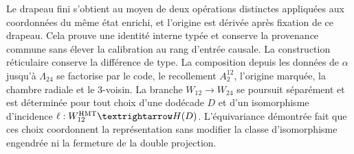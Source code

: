 Le drapeau fini s'obtient au moyen de deux opérations distinctes appliquées aux
coordonnées du même état enrichi, et l'origine est dérivée après
fixation de ce drapeau. Cela prouve une identité interne typée et conserve la
provenance commune sans élever la calibration au rang d'entrée causale. La
construction réticulaire conserve la différence de type. La composition depuis
les données de \(\alpha\) jusqu'à \(\Lambda_{24}\) se factorise par le code, le
recollement \(A_2^{12}\), l'origine marquée, la chambre radiale et le 3-voisin. La
branche \(W_{12}\to W_{24}\) se poursuit séparément et est déterminée pour tout
choix d'une dodécade \(D\) et d'un isomorphisme d'incidence
\(\ell:W_{12}^{\rm HMT}\to\mathcal H(D)\). L'équivariance démontrée fait
que ces choix coordonnent la représentation sans modifier la classe
d'isomorphisme engendrée ni la fermeture de la double projection.
